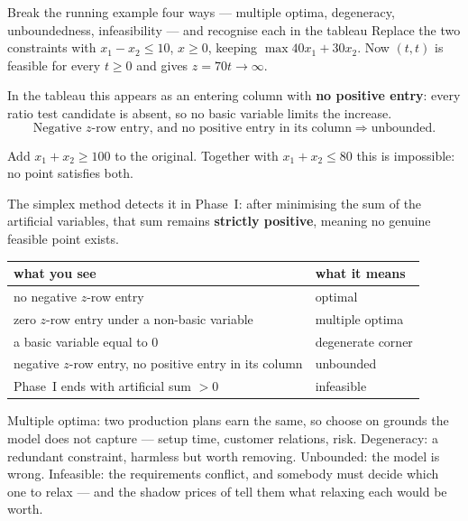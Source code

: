 \begin{worked}{Break the running example four ways --- multiple optima, degeneracy, unboundedness, infeasibility --- and recognise each in the tableau}
Replace the two constraints with $x_{1}-x_{2}\le10$, $x\ge0$, keeping
$\max40x_{1}+30x_{2}$. Now $(t,t)$ is feasible for every $t\ge0$ and gives
$z=70t\to\infty$.

In the tableau this appears as an entering column with \textbf{no positive
entry}: every ratio test candidate is absent, so no basic variable limits
the increase.
\[
  \boxed{\text{Negative }z\text{-row entry, and no positive entry in its column}\Rightarrow\text{unbounded.}}
\]

Add $x_{1}+x_{2}\ge100$ to the original. Together with $x_{1}+x_{2}\le80$
this is impossible: no point satisfies both.

The simplex method detects it in Phase~I: after minimising the sum of the
artificial variables, that sum remains \textbf{strictly positive}, meaning
no genuine feasible point exists.

\begin{center}\footnotesize
\begin{tabular}{ll}
  \hline
  what you see & what it means\\
  \hline
  no negative $z$-row entry & optimal\\
  zero $z$-row entry under a non-basic variable & multiple optima\\
  a basic variable equal to $0$ & degenerate corner\\
  negative $z$-row entry, no positive entry in its column & unbounded\\
  Phase~I ends with artificial sum $>0$ & infeasible\\
  \hline
\end{tabular}
\end{center}

Multiple optima: two production plans earn the same, so choose on grounds
the model does not capture --- setup time, customer relations, risk.
Degeneracy: a redundant constraint, harmless but worth removing.
Unbounded: the model is wrong. Infeasible: the requirements conflict, and
somebody must decide which one to relax --- and the shadow prices of
 tell them what relaxing each would be worth.
\end{worked}

